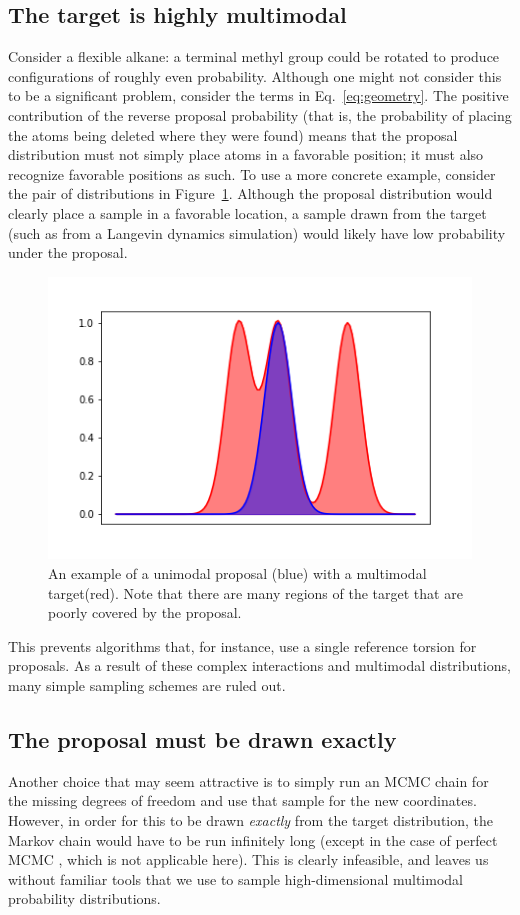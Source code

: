 \subsection{The target is highly multimodal}
%
Consider a flexible alkane: a terminal methyl group could be rotated to produce configurations of roughly even probability.
%
Although one might not consider this to be a significant problem, consider the terms in Eq.~\ref{eq:geometry}.
%
The positive contribution of the reverse proposal probability (that is, the probability of placing the atoms being deleted where they were found) means that the proposal distribution must not simply place atoms in a favorable position; it must also recognize favorable positions as such.
%
To use a more concrete example, consider the pair of distributions in Figure~\ref{fig:1D-geometry}. 
%
Although the proposal distribution would clearly place a sample in a favorable location, a sample drawn from the target (such as from a Langevin dynamics simulation) would likely have low probability under the proposal.
%
\begin{figure}[h]
    \centering
    \includegraphics[width=1.0\textwidth]{unimodal.png}
    \caption{An example of a unimodal proposal (blue) with a multimodal target(red). Note that there are many regions of the target that are poorly covered by the proposal.}
    \label{fig:1D-geometry}
\end{figure}
%
This prevents algorithms that, for instance, use a single reference torsion for proposals.
%
As a result of these complex interactions and multimodal distributions, many simple sampling schemes are ruled out.
%
\subsection{The proposal must be drawn exactly}
%
Another choice that may seem attractive is to simply run an MCMC chain for the missing degrees of freedom and use that sample for the new coordinates.
%
However, in order for this to be drawn \emph{exactly} from the target distribution, the Markov chain would have to be run infinitely long (except in the case of perfect MCMC \cite{brooks2011handbook}, which is not applicable here).
%
This is clearly infeasible, and leaves us without familiar tools that we use to sample high-dimensional multimodal probability distributions.
%

